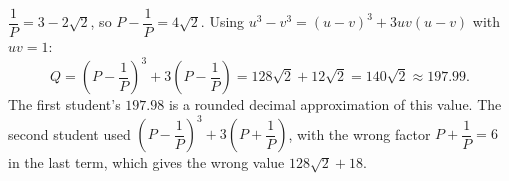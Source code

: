 $\dfrac1P=3-2\sqrt2$, so $P-\dfrac1P=4\sqrt2$. Using $u^3-v^3=(u-v)^3+3uv(u-v)$ with $uv=1$:
\[Q=\left(P-\dfrac1P\right)^3+3\left(P-\dfrac1P\right)=128\sqrt2+12\sqrt2=\boxed{140\sqrt2}\approx197.99.\]
The first student's $197.98$ is a rounded decimal approximation of this value. The second student used $\left(P-\dfrac1P\right)^3+3\left(P+\dfrac1P\right)$, with the wrong factor $P+\dfrac1P=6$ in the last term, which gives the wrong value $128\sqrt2+18$.
